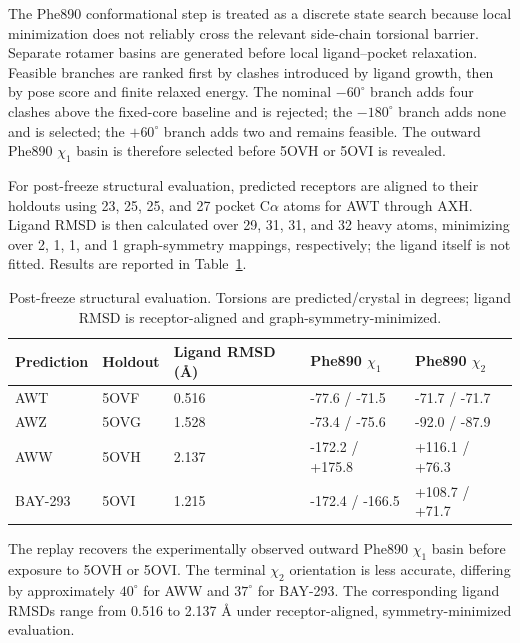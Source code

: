 \documentclass[11pt]{article}
\begin{document}
\begin{small}
The Phe890 conformational step is treated as a discrete state search because local minimization does not reliably cross the relevant side-chain torsional barrier. Separate rotamer basins are generated before local ligand--pocket relaxation. Feasible branches are ranked first by clashes introduced by ligand growth, then by pose score and finite relaxed energy. The nominal $-60^{\circ}$ branch adds four clashes above the fixed-core baseline and is rejected; the $-180^{\circ}$ branch adds none and is selected; the $+60^{\circ}$ branch adds two and remains feasible. The outward Phe890 $\chi_1$ basin is therefore selected before 5OVH or 5OVI is revealed.

For post-freeze structural evaluation, predicted receptors are aligned to their holdouts using 23, 25, 25, and 27 pocket C$\alpha$ atoms for AWT through AXH. Ligand RMSD is then calculated over 29, 31, 31, and 32 heavy atoms, minimizing over 2, 1, 1, and 1 graph-symmetry mappings, respectively; the ligand itself is not fitted. Results are reported in Table~\ref{tab:appA_sos1_eval}.

\begin{table}[htbp]
\centering\small
\caption{Post-freeze structural evaluation. Torsions are predicted/crystal in degrees; ligand RMSD is receptor-aligned and graph-symmetry-minimized.}
\label{tab:appA_sos1_eval}
\begin{tabular}{@{}lllll@{}}
\toprule
\textbf{Prediction} & \textbf{Holdout} & \textbf{Ligand RMSD (\AA{})} & \textbf{Phe890 $\chi_1$} & \textbf{Phe890 $\chi_2$}\\
\midrule
AWT & 5OVF & 0.516 & -77.6 / -71.5 & -71.7 / -71.7\\
AWZ & 5OVG & 1.528 & -73.4 / -75.6 & -92.0 / -87.9\\
AWW & 5OVH & 2.137 & -172.2 / +175.8 & +116.1 / +76.3\\
BAY-293 & 5OVI & 1.215 & -172.4 / -166.5 & +108.7 / +71.7\\
\bottomrule
\end{tabular}
\end{table}

The replay recovers the experimentally observed outward Phe890 $\chi_1$ basin before exposure to 5OVH or 5OVI. The terminal $\chi_2$ orientation is less accurate, differing by approximately $40^{\circ}$ for AWW and $37^{\circ}$ for BAY-293. The corresponding ligand RMSDs range from 0.516 to 2.137 \AA{} under receptor-aligned, symmetry-minimized evaluation.


\end{small}
\end{document}
